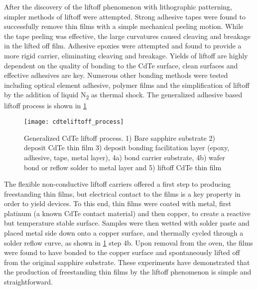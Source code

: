 After the discovery of the liftoff phenomenon with lithographic patterning, simpler methods of liftoff were attempted.
Strong adhesive tapes were found to successfully remove thin films with a simple mechanical peeling motion.
While the tape peeling was effective, the large curvatures caused cleaving and breakage in the lifted off film.
Adhesive epoxies were attempted and found to provide a more rigid carrier, eliminating cleaving and breakage.
Yields of liftoff are highly dependent on the quality of bonding to the CdTe surface, clean surfaces and effective adhesives are key.
Numerous other bonding methods were tested including optical element adhesive, polymer films and the simplification of liftoff by the addition of liquid N\textsubscript{2} as thermal shock.
The generalized adhesive based liftoff process is shown in \cref{fig:cdteliftoff_process}
\begin{figure}
 \centering \texttt{[image: cdteliftoff\_process]}
 \caption[Generalized CdTe liftoff process]{\label{fig:cdteliftoff_process}Generalized CdTe liftoff process. 1) Bare sapphire substrate 2) deposit CdTe thin film 3) deposit bonding facilitation layer (epoxy, adhesive, tape, metal layer), 4a) bond carrier substrate, 4b) wafer bond or reflow solder to metal layer and 5) liftoff CdTe thin film}
\end{figure}
The flexible non-conductive liftoff carriers offered a first step to producing freestanding thin films, but electrical contact to the films is a key property in order to yield devices.
To this end, thin films were coated with metal, first platinum (a known CdTe contact material) and then copper, to create a reactive but temperature stable surface.
Samples were then wetted with solder paste and placed metal side down onto a copper surface, and thermally cycled through a solder reflow curve, as shown in \cref{fig:cdteliftoff_process} step 4b.
Upon removal from the oven, the films were found to have bonded to the copper surface and spontaneously lifted off from the original sapphire substrate.
These experiments have demonstrated that the production of freestanding thin films by the liftoff phenomenon is simple and straightforward.

